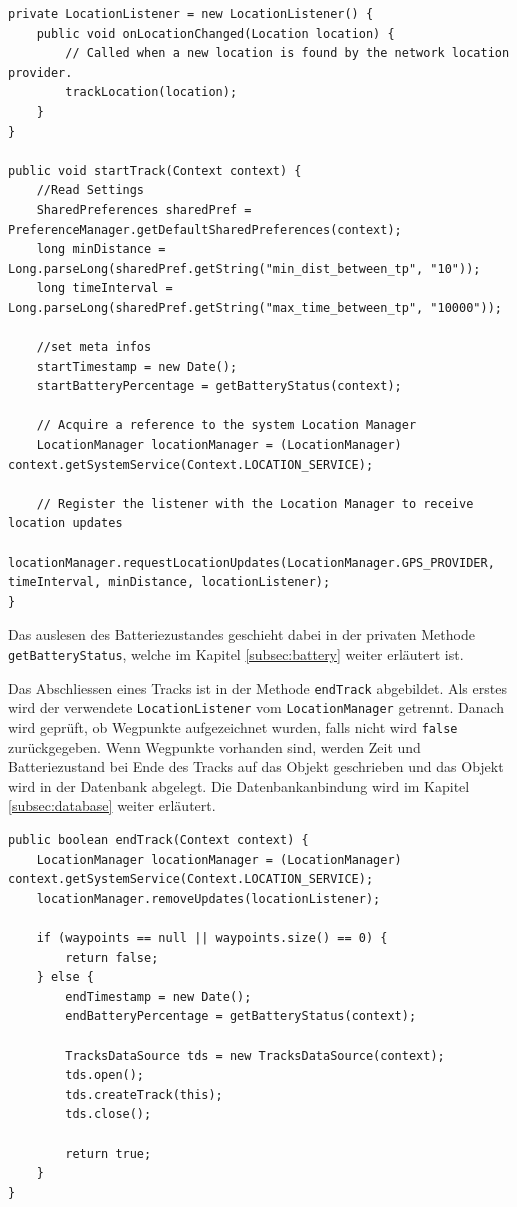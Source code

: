 \begin{lstlisting}[caption={startTrack Methode}, label={lst:starttrack}]
private LocationListener = new LocationListener() {
	public void onLocationChanged(Location location) {
		// Called when a new location is found by the network location provider.
		trackLocation(location);
	}
}

public void startTrack(Context context) {
	//Read Settings
	SharedPreferences sharedPref = PreferenceManager.getDefaultSharedPreferences(context);
	long minDistance = Long.parseLong(sharedPref.getString("min_dist_between_tp", "10"));
	long timeInterval = Long.parseLong(sharedPref.getString("max_time_between_tp", "10000"));
	
	//set meta infos
	startTimestamp = new Date();
	startBatteryPercentage = getBatteryStatus(context);

	// Acquire a reference to the system Location Manager
	LocationManager locationManager = (LocationManager) context.getSystemService(Context.LOCATION_SERVICE);

	// Register the listener with the Location Manager to receive location updates
	locationManager.requestLocationUpdates(LocationManager.GPS_PROVIDER, timeInterval, minDistance, locationListener);
}
\end{lstlisting}

Das auslesen des Batteriezustandes geschieht dabei in der privaten Methode \lstinline$getBatteryStatus$, welche im Kapitel \ref{subsec:battery} weiter erläutert ist.

Das Abschliessen eines Tracks ist in der Methode \lstinline$endTrack$ abgebildet. Als erstes wird der verwendete \lstinline$LocationListener$ vom \lstinline$LocationManager$ getrennt. Danach wird geprüft, ob Wegpunkte aufgezeichnet wurden, falls nicht wird \lstinline$false$ zurückgegeben. Wenn Wegpunkte vorhanden sind, werden Zeit und Batteriezustand bei Ende des Tracks auf das Objekt geschrieben und das Objekt wird in der Datenbank abgelegt. Die Datenbankanbindung wird im Kapitel \ref{subsec:database} weiter erläutert.

\begin{lstlisting}[caption={endTrack Methode}, label={lst:endtrack}]
public boolean endTrack(Context context) {
	LocationManager locationManager = (LocationManager) context.getSystemService(Context.LOCATION_SERVICE);
	locationManager.removeUpdates(locationListener);

	if (waypoints == null || waypoints.size() == 0) {
		return false;
	} else {
		endTimestamp = new Date();
		endBatteryPercentage = getBatteryStatus(context);

		TracksDataSource tds = new TracksDataSource(context);
		tds.open();
		tds.createTrack(this);
		tds.close();

		return true;
	}
}
\end{lstlisting}

